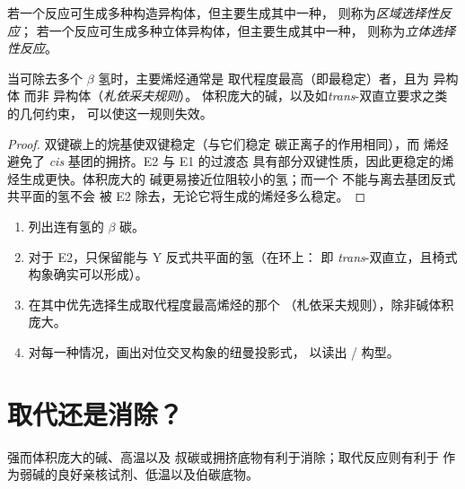 \begin{definition}[区域选择性反应与立体选择性反应]\label{def:b1:elimination:selectivity}
若一个反应可生成多种构造异构体，但主要生成其中一种，
则称为\emph{区域选择性反应}；
若一个反应可生成多种立体异构体，但主要生成其中一种，
则称为\emph{立体选择性反应}。
\end{definition}

\begin{proposition}[札依采夫规则]\label{prop:b1:elimination:zaitsev}
当可除去多个 $\beta$ 氢时，主要烯烃通常是
取代程度最高（即最稳定）者，且为  异构体
而非  异构体（\emph{札依采夫规则}）。
体积庞大的碱，以及如\textit{trans}-双直立要求之类的几何约束，
可以使这一规则失效。
\end{proposition}

\begin{proof}
双键碳上的烷基使双键稳定（与它们稳定
碳正离子的作用相同），而  烯烃避免了
\textit{cis} 基团的拥挤。E2 与 E1 的过渡态
具有部分双键性质，因此更稳定的烯烃生成更快。体积庞大的
碱更易接近位阻较小的氢；而一个
不能与离去基团反式共平面的氢不会
被 E2 除去，无论它将生成的烯烃多么稳定。
\end{proof}

\begin{method}[预测烯烃产物]\label{met:b1:elimination:predict-alkene}
\begin{enumerate}
  \item 列出连有氢的 $\beta$ 碳。
  \item 对于 E2，只保留能与 Y 反式共平面的氢（在环上：
        即 \textit{trans}-双直立，且椅式构象确实可以形成）。
  \item 在其中优先选择生成取代程度最高烯烃的那个
        （札依采夫规则），除非碱体积庞大。
  \item 对每一种情况，画出对位交叉构象的纽曼投影式，
        以读出 / 构型。
\end{enumerate}
\end{method}

\section{取代还是消除？}

\begin{proposition}[取代与消除的竞争]\label{prop:b1:elimination:sn-vs-e}
强而体积庞大的碱、高温以及
叔碳或拥挤底物有利于消除；取代反应则有利于
作为弱碱的良好亲核试剂、低温以及伯碳底物。
\end{proposition}

